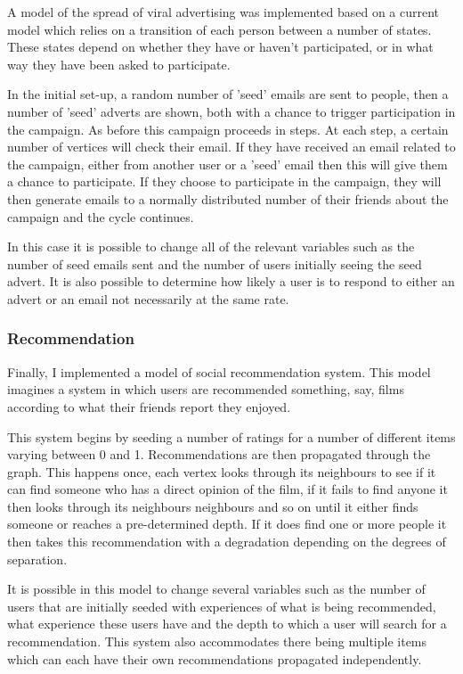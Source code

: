\documentclass[12pt,a4paper]{article}
\begin{document}
A model of the spread of viral advertising was implemented based on a current model \cite{van2010viral} which relies on a transition of each person between a number of states. These states depend on whether they have or haven’t participated, or in what way they have been asked to participate.

In the initial set-up, a random number of 'seed' emails are sent to people, then a number of 'seed' adverts are shown, both with a chance to trigger participation in the campaign. As before this campaign proceeds in steps. At each step, a certain number of vertices will check their email. If they have received an email related to the campaign, either from another user or a 'seed' email then this will give them a chance to participate. If they choose to participate in the campaign, they will then generate emails to a normally distributed number of their friends about the campaign and the cycle continues.

In this case it is possible to change all of the relevant variables such as the number of seed emails sent and the number of users initially seeing the seed advert. It is also possible to determine how likely a user is to respond to either an advert or an email not necessarily at the same rate.

\subsubsection{Recommendation}

Finally, I implemented a model of social recommendation system\cite{walter2008model}. This model imagines a system in which users are recommended something, say, films according to what their friends report they enjoyed.

This system begins by seeding a number of ratings for a number of different items varying between 0 and 1. Recommendations are then propagated through the graph. This happens once, each vertex looks through its neighbours to see if it can find someone who has a direct opinion of the film, if it fails to find anyone it then looks through its neighbours neighbours and so on until it either finds someone or reaches a pre-determined depth. If it does find one or more people it then takes this recommendation with a degradation depending on the degrees of separation.

It is possible in this model to change several variables such as the number of users that are initially seeded with experiences of what is being recommended, what experience these users have and the depth to which a user will search for a recommendation. This system also accommodates there being multiple items which can each have their own recommendations propagated independently.
\end{document}
